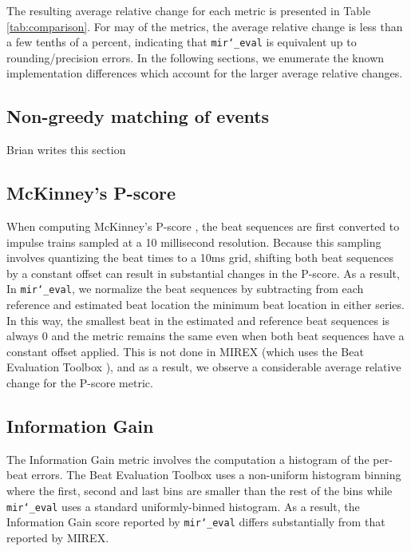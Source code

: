 \documentclass{article}
\def\mireval{\texttt{mir\char`_eval}}
\begin{document}
The resulting average relative change for each metric is presented in Table \ref{tab:comparison}.
For may of the metrics, the average relative change is less than a few tenths of a percent, indicating that \mireval{} is equivalent up to rounding/precision errors.
In the following sections, we enumerate the known implementation differences which account for the larger average relative changes.

\subsection{Non-greedy matching of events}

Brian writes this section

\subsection{McKinney's P-score}

When computing McKinney's P-score \cite{davies2009evaluation}, the beat sequences are first converted to impulse trains sampled at a 10 millisecond resolution.
Because this sampling involves quantizing the beat times to a 10ms grid, shifting both beat sequences by a constant offset can result in substantial changes in the P-score.
As a result, In \mireval{}, we normalize the beat sequences by subtracting from each reference and estimated beat location the minimum beat location in either series.
In this way, the smallest beat in the estimated and reference beat sequences is always $0$ and the metric remains the same even when both beat sequences have a constant offset applied.
This is not done in MIREX (which uses the Beat Evaluation Toolbox \cite{davies2009evaluation}), and as a result, we observe a considerable average relative change for the P-score metric.

\subsection{Information Gain}

The Information Gain metric \cite{davies2009evaluation} involves the computation a histogram of the per-beat errors.
The Beat Evaluation Toolbox uses a non-uniform histogram binning where the first, second and last bins are smaller than the rest of the bins while \mireval{} uses a standard uniformly-binned histogram.
As a result, the Information Gain score reported by \mireval{} differs substantially from that reported by MIREX.

\end{document}
